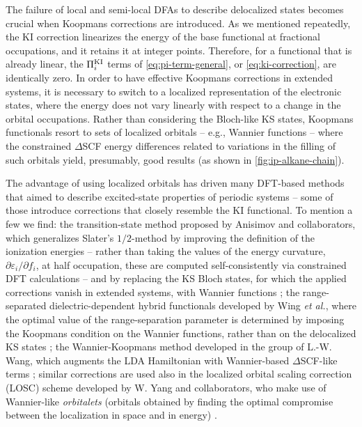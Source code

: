 The failure of local and semi-local DFAs to describe delocalized states becomes crucial when Koopmans corrections are introduced. As we mentioned repeatedly, the KI correction linearizes the energy of the base functional at fractional occupations, and it retains it at integer points. Therefore, for a functional that is already linear, the $\Pi_i^{\rm KI}$ terms of \cref{eq:pi-term-general}, or \cref{eq:ki-correction}, are identically zero. In order to have effective Koopmans corrections in extended systems, it is necessary to switch to a localized representation of the electronic states, where the energy does not vary linearly with respect to a change in the orbital occupations. Rather than considering the Bloch-like KS states, Koopmans functionals resort to sets of localized orbitals -- e.g., Wannier functions -- where the constrained $\Delta$SCF energy differences related to variations in the filling of such orbitals yield, presumably, good results (as shown in \cref{fig:ip-alkane-chain}).

The advantage of using localized orbitals has driven many DFT-based methods that aimed to describe excited-state properties of periodic systems -- some of those introduce corrections that closely resemble the KI functional. To mention a few we find: the transition-state method proposed by Anisimov and collaborators, which generalizes Slater's $1/2$-method by improving the definition of the ionization energies -- rather than taking the values of the energy curvature, $\partial \varepsilon_i / \partial f_i$, at half occupation, these are computed self-consistently via constrained DFT calculations -- and by replacing the KS Bloch states, for which the applied corrections vanish in extended systems, with Wannier functions \cite{anisimov_transition_2005,anisimov_orbital_2007}; the range-separated dielectric-dependent hybrid functionals developed by Wing \emph{et al.}, where the optimal value of the range-separation parameter is determined by imposing the Koopmans condition on the Wannier functions, rather than on the delocalized KS states \cite{wing_band_2021}; the Wannier-Koopmans method developed in the group of L.-W. Wang, which augments the LDA Hamiltonian with Wannier-based $\Delta$SCF-like terms \cite{ma_using_2016,ma_energy_2016,weng_wannier_2017,weng_wannier_2018,li_wannier-koopmans_2018,weng_wannierkoopmans_2020}; similar corrections are used also in the localized orbital scaling correction (LOSC) scheme developed by W. Yang and collaborators, who make use of Wannier-like \emph{orbitalets} (orbitals obtained by finding the optimal compromise between the localization in space and in energy) \cite{li_localized_2018,mei_libsc_2021,mahler_wannier_2022}.

